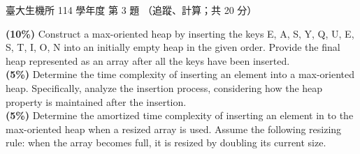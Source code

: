 \begin{pastexam}[label={px:ntu-114-bime-ds-03}]{臺大生機所 114 學年度 第 3 題}
（追蹤、計算；共 20 分）

\textbf{(10\%)} Construct a max-oriented heap by inserting the keys E, A, S, Y, Q, U, E, S, T, I, O,
N into an initially empty heap in the given order. Provide the final heap represented as an array
after all the keys have been inserted.\\
\textbf{(5\%)} Determine the time complexity of inserting an element into a max-oriented heap.
Specifically, analyze the insertion process, considering how the heap property is maintained after
the insertion.\\
\textbf{(5\%)} Determine the amortized time complexity of inserting an element in to the
max-oriented heap when a resized array is used. Assume the following resizing rule: when the array
becomes full, it is resized by doubling its current size.
\end{pastexam}

